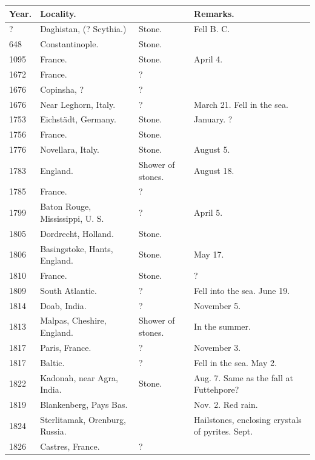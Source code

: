 \documentclass[a4paper, 12pt, oneside]{article}
\begin{document}
\begin{center}
    \footnotesize
    \bfseries
    \begin{longtable}{|p{12mm}|p{45mm}|p{12mm}|p{35mm}|}
    \hline
        Year. & Locality. & ~ & Remarks. \\ \hline
        ? & Daghistan, (? Scythia.) & Stone. & Fell B. C. \\
        648 & Constantinople. & Stone. & ~ \\
        1095 & France. & Stone. & April 4. \\
        1672 & France. & ? & ~ \\
        1676 & Copinsha, ? & ? & ~ \\
        1676 & Near Leghorn, Italy. & ? & March 21. Fell in the sea. \\
        1753 & Eichstädt, Germany. & Stone. & January. ? \\
        1756 & France. & Stone. & ~ \\
        1776 & Novellara, Italy. & Stone. & August 5. \\
        1783 & England. & Shower of stones. & August 18. \\
        1785 & France. & ? & ~ \\
        1799 & Baton Rouge, Mississippi, U. S. & ? & April 5. \\
        1805 & Dordrecht, Holland. & Stone. & ~ \\
        1806 & Basingstoke, Hants, England. & Stone. & May 17. \\
        1810 & France. & Stone. & ? \\
        1809 & South Atlantic. & ? & Fell into the sea. June 19. \\
        1814 & Doab, India. & ? & November 5. \\
        1813 & Malpas, Cheshire, England. & Shower of stones. & In the summer. \\
        1817 & Paris, France. & ? & November 3. \\
        1817 & Baltic. & ? & Fell in the sea. May 2. \\
        1822 & Kadonah, near Agra, India. & Stone. & Aug. 7. Same as the fall at Futtehpore? \\
        1819 & Blankenberg, Pays Bas. & ~ & Nov. 2. Red rain. \\
        1824 & Sterlitamak, Orenburg, Russia. & ~ & Hailstones, enclosing crystals of pyrites. Sept. \\
        1826 & Castres, France. & ? & ~ \\

\end{longtable}
\end{center}
\end{document}
